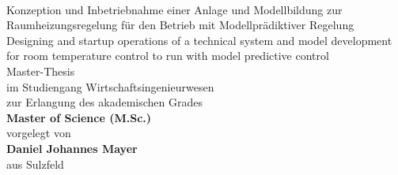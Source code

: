 %
%

\begin{titlepage}
   \mbox{}\\
   \rmfamily\huge
   \centering
	\rmfamily\mdseries\huge{Konzeption und Inbetriebnahme einer Anlage und Modellbildung zur Raumheizungsregelung für den Betrieb mit Modellprädiktiver Regelung}
   \vspace{1\baselineskip}\\
	\rmfamily\mdseries\upshape\normalsize{Designing and startup operations of a technical system and model development for room temperature control to run with model predictive control}
  \vspace{3\baselineskip}\\
   \rmfamily\mdseries\upshape\normalsize{
 Master-Thesis\\
im Studiengang Wirtschaftsingenieurwesen} 
  \vspace{2\baselineskip}\\
  \rmfamily\mdseries\upshape\normalsize{	
zur Erlangung des akademischen Grades\\
\textsf{\textbf{Master of Science (M.Sc.)}}}\\
   \vspace{3\baselineskip}
   \rmfamily\mdseries\upshape\normalsize{
   vorgelegt von\\
   \textsf{\textbf{Daniel Johannes Mayer}}\\
   aus Sulzfeld}
   \vspace{3\baselineskip}\\
\flushleft
\rmfamily\mdseries{}
   \vspace{3\baselineskip}\\
\centering\   \rmfamily\mdseries{}	   
\end{titlepage}


